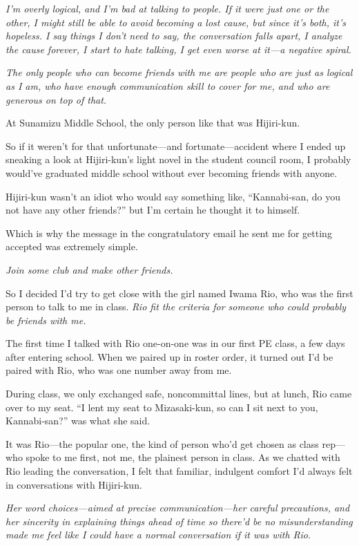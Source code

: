 \documentclass[
    a4paper,
    12pt,
    twoside,
    openany,
    UTF8,
    fontset=windows
]{ctexbook}
\begin{document}
\textit{I'm overly logical, and I'm bad at talking to people. If it were just one or the other, I might still be able to avoid becoming a lost cause, but since it's both, it's hopeless. I say things I don't need to say, the conversation falls apart, I analyze the cause forever, I start to hate talking, I get even worse at it---a negative spiral.}

\textit{The only people who can become friends with me are people who are just as logical as I am, who have enough communication skill to cover for me, and who are generous on top of that.}

At Sunamizu Middle School, the only person like that was Hijiri-kun.

So if it weren't for that unfortunate---and fortunate---accident where I ended up sneaking a look at Hijiri-kun's light novel in the student council room, I probably would've graduated middle school without ever becoming friends with anyone.

Hijiri-kun wasn't an idiot who would say something like, ``Kannabi-san, do you not have any other friends?'' but I'm certain he thought it to himself.

Which is why the message in the congratulatory email he sent me for getting accepted was extremely simple.

\textit{Join some club and make other friends.}

So I decided I'd try to get close with the girl named Iwama Rio, who was the first person to talk to me in class. \textit{Rio fit the criteria for someone who could probably be friends with me.}

The first time I talked with Rio one-on-one was in our first PE class, a few days after entering school. When we paired up in roster order, it turned out I'd be paired with Rio, who was one number away from me.

During class, we only exchanged safe, noncommittal lines, but at lunch, Rio came over to my seat. ``I lent my seat to Mizasaki-kun, so can I sit next to you, Kannabi-san?'' was what she said.

It was Rio---the popular one, the kind of person who'd get chosen as class rep---who spoke to me first, not me, the plainest person in class. As we chatted with Rio leading the conversation, I felt that familiar, indulgent comfort I'd always felt in conversations with Hijiri-kun.

\textit{Her word choices---aimed at precise communication---her careful precautions, and her sincerity in explaining things ahead of time so there'd be no misunderstanding made me feel like I could have a normal conversation if it was with Rio.}
\end{document}
